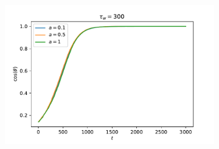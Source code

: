 \documentclass[12pt]{article}
\begin{document}
\begin{figure}[ht]
\begin{subfigure}[b]{0.32\textwidth}
    \caption{}
    \label{fig:2}
  \end{subfigure}
  \begin{subfigure}[b]{0.32\textwidth}
    \includegraphics[width=\textwidth]{1.300.pdf}
    \caption{}
    \label{fig:3}
  \end{subfigure}  
  
  \vspace{0.6cm}
  
  \caption{}
  
\end{figure}
\end{document}
